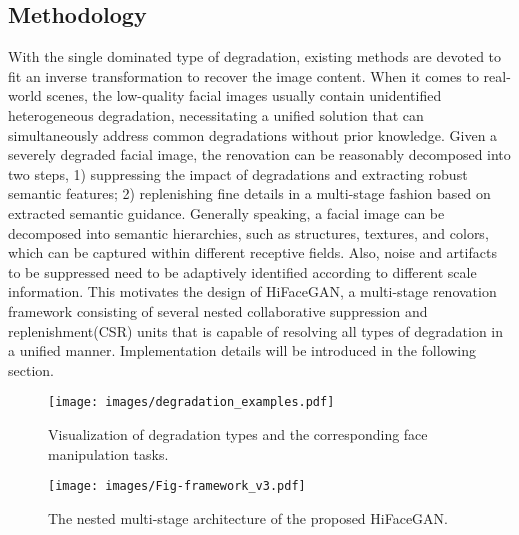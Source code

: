\documentclass[sigconf]{acmart}
\begin{document}
\subsection{Methodology}
With the single dominated type of degradation, existing methods are devoted to fit an inverse transformation to recover the image content. When it comes to real-world scenes, the low-quality facial images usually contain unidentified heterogeneous degradation, necessitating a unified solution that can simultaneously address common degradations without prior knowledge.
Given a severely degraded facial image, the renovation can be reasonably decomposed into two steps, 1) suppressing the impact of degradations and extracting robust semantic features; 2) replenishing fine details in a multi-stage fashion based on extracted semantic guidance.
Generally speaking, a facial image can be decomposed into semantic hierarchies, such as structures, textures, and colors, which can be captured within different receptive fields. Also, noise and artifacts to be suppressed need to be adaptively identified according to different scale information.
This motivates the design of HiFaceGAN, a multi-stage renovation framework consisting of several nested collaborative suppression and replenishment(CSR) units that is capable of resolving all types of degradation in a unified manner. Implementation details will be introduced in the following section.

\begin{figure}[!pt]
  \centering
  \texttt{[image: images/degradation\_examples.pdf]}
  \caption{Visualization of degradation types and the corresponding face manipulation tasks. }
  \label{fig:deg_egs}
\end{figure}


\begin{figure*}[!t]
  \centering
\texttt{[image: images/Fig-framework\_v3.pdf]}
  \caption{The nested multi-stage architecture of the proposed HiFaceGAN.}\label{fig:network}
\end{figure*}
\end{document}
